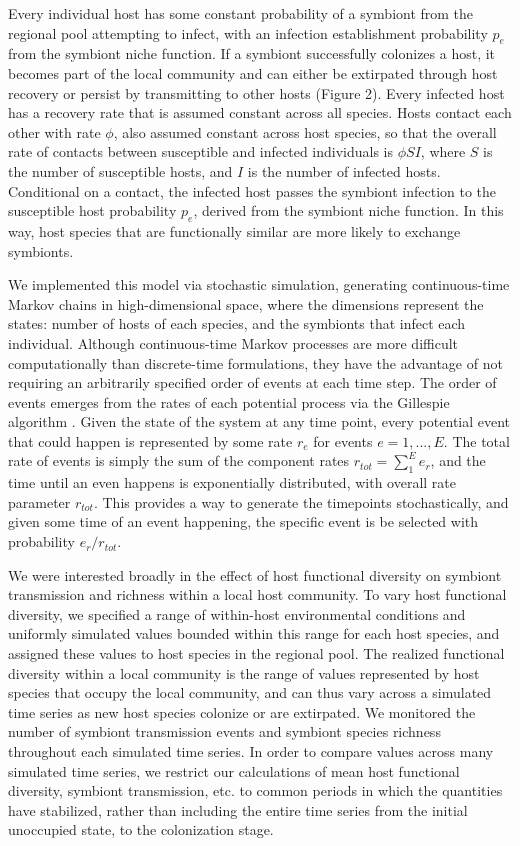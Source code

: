 \documentclass[12pt]{article}
\begin{document}
Every individual host has some constant probability of a symbiont from the regional pool attempting to infect, with an infection establishment probability $p_e$ from the symbiont niche function. 
If a symbiont successfully colonizes a host, it becomes part of the local community and can either be extirpated through host recovery or persist by transmitting to other hosts (Figure 2). 
Every infected host has a recovery rate that is assumed constant across all species. 
Hosts contact each other with rate $\phi$, also assumed constant across host species, so that the overall rate of contacts between susceptible and infected individuals is $\phi S I$, where $S$ is the number of susceptible hosts, and $I$ is the number of infected hosts.
Conditional on a contact, the infected host passes the symbiont infection to the susceptible host probability $p_e$, derived from the symbiont niche function.
In this way, host species that are functionally similar are more likely to exchange symbionts.

We implemented this model via stochastic simulation, generating continuous-time Markov chains in high-dimensional space, where the dimensions represent the states: number of hosts of each species, and the symbionts that infect each individual. 
Although continuous-time Markov processes are more difficult computationally than discrete-time formulations, they have the advantage of not requiring an arbitrarily specified order of events at each time step. 
The order of events emerges from the rates of each potential process via the Gillespie algorithm \citep{Gillespie1976}. 
Given the state of the system at any time point, every potential event that could happen is represented by some rate $r_e$ for events $e = 1, ..., E$. 
The total rate of events is simply the sum of the component rates $r_{tot} = \sum_{1}^{E} e_r$, and the time until an even happens is exponentially distributed, with overall rate parameter $r_{tot}$. 
This provides a way to generate the timepoints stochastically, and given some time of an event happening, the specific event is be selected with probability $e_r / r_{tot}$. 

We were interested broadly in the effect of host functional diversity on symbiont transmission and richness within a local host community.
To vary host functional diversity, we specified a range of within-host environmental conditions and uniformly simulated values bounded within this range for each host species, and assigned these values to host species in the regional pool. 
The realized functional diversity within a local community is the range of values represented by host species that occupy the local community, and can thus vary across a simulated time series as new host species colonize or are extirpated. 
We monitored the number of symbiont transmission events and symbiont species richness throughout each simulated time series. 
In order to compare values across many simulated time series, we restrict our calculations of mean host functional diversity, symbiont transmission, etc. to common periods in which the quantities have stabilized, rather than including the entire time series from the initial unoccupied state, to the colonization stage. %
\end{document}
